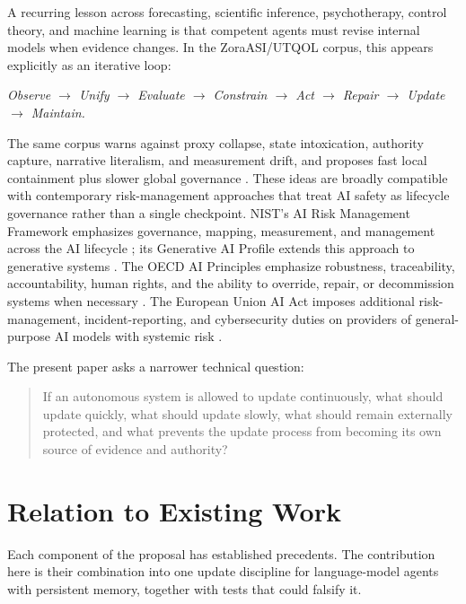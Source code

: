\documentclass[11pt]{article}
\begin{document}
A recurring lesson across forecasting, scientific inference, psychotherapy, control theory, and machine learning is that competent agents must revise internal models when evidence changes. In the ZoraASI/UTQOL corpus, this appears explicitly as an iterative loop:

\begin{center}
\emph{Observe $\rightarrow$ Unify $\rightarrow$ Evaluate $\rightarrow$ Constrain $\rightarrow$ Act $\rightarrow$ Repair $\rightarrow$ Update $\rightarrow$ Maintain.}
\end{center}

The same corpus warns against proxy collapse, state intoxication, authority capture, narrative literalism, and measurement drift, and proposes fast local containment plus slower global governance \cite{baird2026archive}. These ideas are broadly compatible with contemporary risk-management approaches that treat AI safety as lifecycle governance rather than a single checkpoint. NIST's AI Risk Management Framework emphasizes governance, mapping, measurement, and management across the AI lifecycle \cite{nist2023}; its Generative AI Profile extends this approach to generative systems \cite{nist2024}. The OECD AI Principles emphasize robustness, traceability, accountability, human rights, and the ability to override, repair, or decommission systems when necessary \cite{oecd2024}. The European Union AI Act imposes additional risk-management, incident-reporting, and cybersecurity duties on providers of general-purpose AI models with systemic risk \cite{eu2025}.

The present paper asks a narrower technical question:

\begin{quote}
If an autonomous system is allowed to update continuously, what should update quickly, what should update slowly, what should remain externally protected, and what prevents the update process from becoming its own source of evidence and authority?
\end{quote}

\section{Relation to Existing Work}

Each component of the proposal has established precedents. The contribution here is their combination into one update discipline for language-model agents with persistent memory, together with tests that could falsify it.
\end{document}
